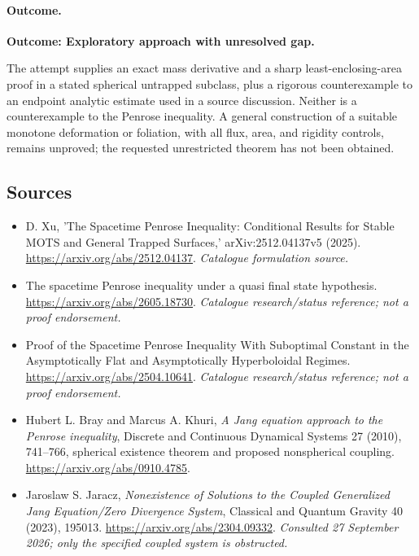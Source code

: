 \documentclass[11pt,a4paper]{article}
\numberwithin{equation}{section}
\begin{document}
\paragraph{Outcome.}
\textbf{Outcome: Exploratory approach with unresolved gap.}

The attempt supplies an exact mass derivative and a sharp least-enclosing-area
proof in a stated spherical untrapped subclass, plus a rigorous counterexample
to an endpoint analytic estimate used in a source discussion. Neither is a
counterexample to the Penrose inequality. A general construction of a suitable
monotone deformation or foliation, with all flux, area, and rigidity controls,
remains unproved; the requested unrestricted theorem has not been obtained.


\subsection{Sources}
\begin{itemize}\raggedright
\item[\textnormal{[S1]}]\hypertarget{source:37:1}{} D. Xu, 'The Spacetime Penrose Inequality: Conditional Results for Stable MOTS and General Trapped Surfaces,' arXiv:2512.04137v5 (2025).
\url{https://arxiv.org/abs/2512.04137}.
{\small\textit{Catalogue formulation source.}}
\item[\textnormal{[S2]}]\hypertarget{source:37:2}{} The spacetime Penrose inequality under a quasi final state hypothesis.
\url{https://arxiv.org/abs/2605.18730}.
{\small\textit{Catalogue research/status reference; not a proof endorsement.}}
\item[\textnormal{[S3]}]\hypertarget{source:37:3}{} Proof of the Spacetime Penrose Inequality With Suboptimal Constant in the Asymptotically Flat and Asymptotically Hyperboloidal Regimes.
\url{https://arxiv.org/abs/2504.10641}.
{\small\textit{Catalogue research/status reference; not a proof endorsement.}}
\item[\textnormal{[E1]}]\hypertarget{extra:37:1}{} Hubert L. Bray and Marcus A. Khuri,
\emph{A Jang equation approach to the Penrose inequality}, Discrete and Continuous
Dynamical Systems 27 (2010), 741--766, spherical existence theorem and proposed nonspherical coupling.
\url{https://arxiv.org/abs/0910.4785}.
\item[\textnormal{[E2]}]\hypertarget{extra:37:2}{} Jaroslaw S. Jaracz,
\emph{Nonexistence of Solutions to the Coupled Generalized Jang Equation/Zero Divergence System}, Classical and Quantum Gravity 40 (2023), 195013.
\url{https://arxiv.org/abs/2304.09332}.
{\small\textit{Consulted 27 September 2026; only the specified coupled system is obstructed.}}

\end{itemize}

\end{document}
